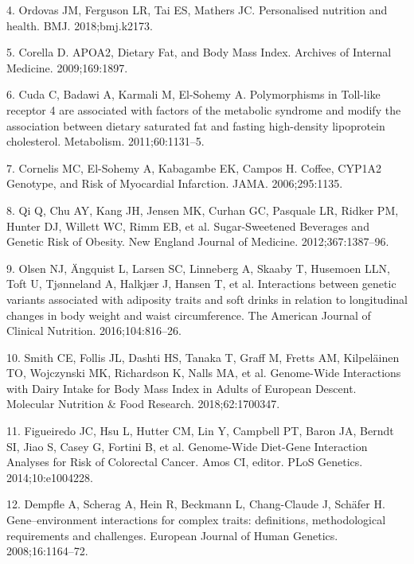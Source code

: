\documentclass[]{article}
\begin{document}
\leavevmode\hypertarget{ref-Ordovas2018}{}%
4. Ordovas JM, Ferguson LR, Tai ES, Mathers JC. Personalised nutrition
and health. BMJ. 2018;bmj.k2173.

\leavevmode\hypertarget{ref-Corella2009}{}%
5. Corella D. APOA2, Dietary Fat, and Body Mass Index. Archives of
Internal Medicine. 2009;169:1897.

\leavevmode\hypertarget{ref-Cuda2011}{}%
6. Cuda C, Badawi A, Karmali M, El-Sohemy A. Polymorphisms in Toll-like
receptor 4 are associated with factors of the metabolic syndrome and
modify the association between dietary saturated fat and fasting
high-density lipoprotein cholesterol. Metabolism. 2011;60:1131--5.

\leavevmode\hypertarget{ref-Cornelis2006}{}%
7. Cornelis MC, El-Sohemy A, Kabagambe EK, Campos H. Coffee, CYP1A2
Genotype, and Risk of Myocardial Infarction. JAMA. 2006;295:1135.

\leavevmode\hypertarget{ref-Qi2012}{}%
8. Qi Q, Chu AY, Kang JH, Jensen MK, Curhan GC, Pasquale LR, Ridker PM,
Hunter DJ, Willett WC, Rimm EB, et al. Sugar-Sweetened Beverages and
Genetic Risk of Obesity. New England Journal of Medicine.
2012;367:1387--96.

\leavevmode\hypertarget{ref-Olsen2016}{}%
9. Olsen NJ, Ängquist L, Larsen SC, Linneberg A, Skaaby T, Husemoen LLN,
Toft U, Tjønneland A, Halkjær J, Hansen T, et al. Interactions between
genetic variants associated with adiposity traits and soft drinks in
relation to longitudinal changes in body weight and waist circumference.
The American Journal of Clinical Nutrition. 2016;104:816--26.

\leavevmode\hypertarget{ref-Smith2018}{}%
10. Smith CE, Follis JL, Dashti HS, Tanaka T, Graff M, Fretts AM,
Kilpeläinen TO, Wojczynski MK, Richardson K, Nalls MA, et al.
Genome-Wide Interactions with Dairy Intake for Body Mass Index in Adults
of European Descent. Molecular Nutrition \& Food Research.
2018;62:1700347.

\leavevmode\hypertarget{ref-Figueiredo2014}{}%
11. Figueiredo JC, Hsu L, Hutter CM, Lin Y, Campbell PT, Baron JA,
Berndt SI, Jiao S, Casey G, Fortini B, et al. Genome-Wide Diet-Gene
Interaction Analyses for Risk of Colorectal Cancer. Amos CI, editor.
PLoS Genetics. 2014;10:e1004228.

\leavevmode\hypertarget{ref-Dempfle2008}{}%
12. Dempfle A, Scherag A, Hein R, Beckmann L, Chang-Claude J, Schäfer H.
Gene--environment interactions for complex traits: definitions,
methodological requirements and challenges. European Journal of Human
Genetics. 2008;16:1164--72.
\end{document}
